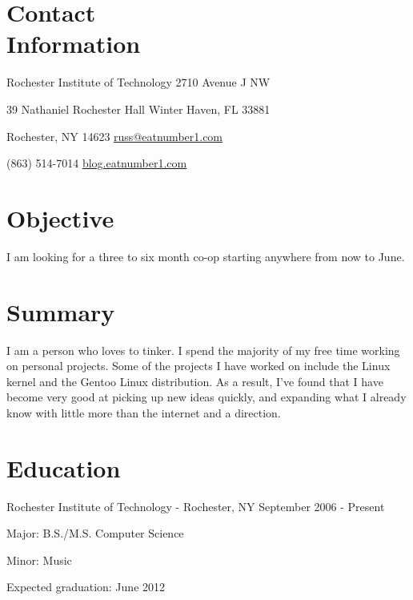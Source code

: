 \documentclass[a4paper,margin,line]{resume}
\newcommand{\rdate}[1]{\hfill {\small #1}}
\begin{document}
\begin{resume}
\section{\mysidestyle Contact \\ Information} \vspace{2mm}
	\begin{asparablank}
		\item Rochester Institute of Technology \hfill 2710 Avenue J NW
		\item 39 Nathaniel Rochester Hall \hfill Winter Haven, FL 33881
		\item Rochester, NY 14623 \hfill \href{mailto:russ@eatnumber1.com}{russ@eatnumber1.com}
		\item (863) 514-7014 \hfill
		\href{http://blog.eatnumber1.com/}{blog.eatnumber1.com}
	\end{asparablank}

\section{\mysidestyle Objective}
	I am looking for a three to six month co-op starting anywhere from now to
	June.

\section{\mysidestyle Summary}
	I am a person who loves to tinker. I spend the majority of my free time
	working on personal projects. Some of the projects I have worked on include
	the Linux kernel and the Gentoo Linux distribution.  As a result, I've found
	that I have become very good at picking up new ideas quickly, and expanding
	what I already know with little more than the internet and a direction.

\section{\mysidestyle Education}
	\begin{compactdesc}
		\item[Rochester Institute of Technology] - Rochester, NY \rdate{September 2006 - Present}
		\begin{compactitem} { \small
			\item Major: B.S./M.S. Computer Science
			\item Minor: Music
			\item Expected graduation: June 2012
		} \end{compactitem}
	\end{compactdesc}


\end{resume}
\end{document}
